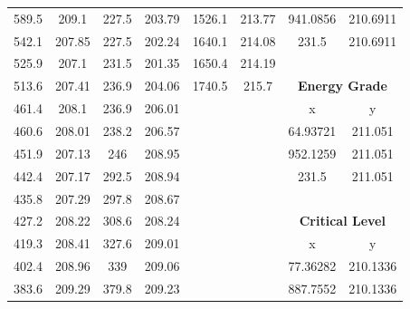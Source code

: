 \begin{center}
\begin{tabular}{|cccc||cc||cc|}
    589.5    & 209.1                   & 227.5 & 203.79                       & 1526.1 & 213.77                      & 941.0856 & 210.6911                           \\
    542.1    & 207.85                  & 227.5 & 202.24                       & 1640.1 & 214.08                      & 231.5    & 210.6911                           \\
    525.9    & 207.1                   & 231.5 & 201.35                       & 1650.4 & 214.19                      &          &                                    \\
    513.6    & 207.41                  & 236.9 & 204.06                       & 1740.5 & 215.7                       & \multicolumn{2}{c|}{\textbf{Energy Grade}}    \\ 
    \cline{7-8}
    461.4    & 208.1                   & 236.9 & 206.01                       &        &                             & x        & y                                  \\
    460.6    & 208.01                  & 238.2 & 206.57                       &        &                             & 64.93721 & 211.051                            \\
    451.9    & 207.13                  & 246   & 208.95                       &        &                             & 952.1259 & 211.051                            \\
    442.4    & 207.17                  & 292.5 & 208.94                       &        &                             & 231.5    & 211.051                            \\
    435.8    & 207.29                  & 297.8 & 208.67                       &        &                             &          &                                    \\
    427.2    & 208.22                  & 308.6 & 208.24                       &        &                             & \multicolumn{2}{c|}{\textbf{Critical Level}}  \\ 
    \cline{7-8}
    419.3    & 208.41                  & 327.6 & 209.01                       &        &                             & x        & y                                  \\
    402.4    & 208.96                  & 339   & 209.06                       &        &                             & 77.36282 & 210.1336                           \\
    383.6    & 209.29                  & 379.8 & 209.23                       &        &                             & 887.7552 & 210.1336                           \\

\end{tabular}
\end{center}
